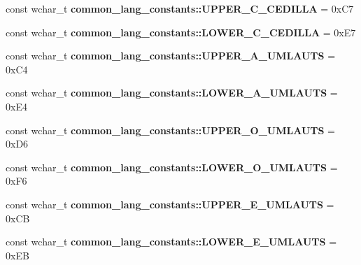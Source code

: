 \begin{DoxyCompactItemize}
\item 
\hypertarget{group___indexing_ga32b07f6fc903b562b65db24006581964}{const wchar\-\_\-t {\bfseries common\-\_\-lang\-\_\-constants\-::\-U\-P\-P\-E\-R\-\_\-\-C\-\_\-\-C\-E\-D\-I\-L\-L\-A} = 0x\-C7}\label{group___indexing_ga32b07f6fc903b562b65db24006581964}

\item 
\hypertarget{group___indexing_ga2ac89662938b8f68b520cce6701dd3a5}{const wchar\-\_\-t {\bfseries common\-\_\-lang\-\_\-constants\-::\-L\-O\-W\-E\-R\-\_\-\-C\-\_\-\-C\-E\-D\-I\-L\-L\-A} = 0x\-E7}\label{group___indexing_ga2ac89662938b8f68b520cce6701dd3a5}

\item 
\hypertarget{group___indexing_gae2305b0b939e2f1110ff83930e75d3a2}{const wchar\-\_\-t {\bfseries common\-\_\-lang\-\_\-constants\-::\-U\-P\-P\-E\-R\-\_\-\-A\-\_\-\-U\-M\-L\-A\-U\-T\-S} = 0x\-C4}\label{group___indexing_gae2305b0b939e2f1110ff83930e75d3a2}

\item 
\hypertarget{group___indexing_ga5c5ffc115703cb8d145435f7cfb75097}{const wchar\-\_\-t {\bfseries common\-\_\-lang\-\_\-constants\-::\-L\-O\-W\-E\-R\-\_\-\-A\-\_\-\-U\-M\-L\-A\-U\-T\-S} = 0x\-E4}\label{group___indexing_ga5c5ffc115703cb8d145435f7cfb75097}

\item 
\hypertarget{group___indexing_ga45ff4cb125ebcd7bdfb655f39436b702}{const wchar\-\_\-t {\bfseries common\-\_\-lang\-\_\-constants\-::\-U\-P\-P\-E\-R\-\_\-\-O\-\_\-\-U\-M\-L\-A\-U\-T\-S} = 0x\-D6}\label{group___indexing_ga45ff4cb125ebcd7bdfb655f39436b702}

\item 
\hypertarget{group___indexing_gad91f23ad1dbbbfec17f57ef925297970}{const wchar\-\_\-t {\bfseries common\-\_\-lang\-\_\-constants\-::\-L\-O\-W\-E\-R\-\_\-\-O\-\_\-\-U\-M\-L\-A\-U\-T\-S} = 0x\-F6}\label{group___indexing_gad91f23ad1dbbbfec17f57ef925297970}

\item 
\hypertarget{group___indexing_ga7624ce64ada9e757601aa79e804ef803}{const wchar\-\_\-t {\bfseries common\-\_\-lang\-\_\-constants\-::\-U\-P\-P\-E\-R\-\_\-\-E\-\_\-\-U\-M\-L\-A\-U\-T\-S} = 0x\-C\-B}\label{group___indexing_ga7624ce64ada9e757601aa79e804ef803}

\item 
\hypertarget{group___indexing_gaff1d3c02db3883477abf74eead9c14b0}{const wchar\-\_\-t {\bfseries common\-\_\-lang\-\_\-constants\-::\-L\-O\-W\-E\-R\-\_\-\-E\-\_\-\-U\-M\-L\-A\-U\-T\-S} = 0x\-E\-B}\label{group___indexing_gaff1d3c02db3883477abf74eead9c14b0}


\end{DoxyCompactItemize}
